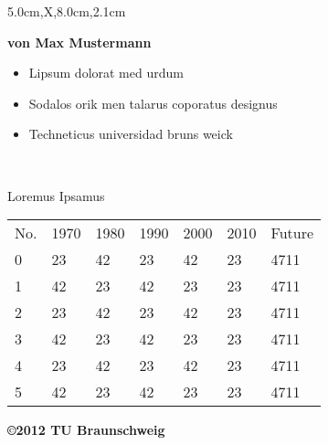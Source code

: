 \documentclass[a2paper,style=scifi,table,parskip=full]{tubsposter}
\begin{document}
  \begin{tubsposter}[bgcolor=tubsGreenLight]{5.0cm,X,8.0cm,2.1cm}
  \begin{posterrow}[bgcolor=tubsViolet,fgcolor=tubsWhite]
    \vfill
    \textbf{\large von Max Mustermann}
  \end{posterrow}
  \begin{posterrow}[X,X]
    \begin{postercol}
      \mdseries{}
      \lipsum[1]\par\lipsum[2]
      \begin{itemize}
        \item Lipsum dolorat med urdum
        \item Sodalos orik men talarus coporatus designus
        \item Techneticus universidad bruns weick
      \end{itemize}
    \end{postercol}
    \begin{postercol}[X,X]
      \begin{postersubrow}[bgimage=infozentrum,imagefit=autoclip]
        ~
      \end{postersubrow}
      \begin{postersubrow}[c,bgcolor=tubsGray20,fgcolor=tubsRed]
        \centering\itshape
        \lipsum[4]\par
        \raggedleft\upshape
        Loremus Ipsamus
      \end{postersubrow}
    \end{postercol}
  \end{posterrow}
  \begin{posterrow*}
    \large
    \begin{tabularx}{\textwidth}{lXXXXXX}
      \rowcolor{tuGray20}
      No. & 1970 & 1980 & 1990 & 2000 & 2010 & Future \\
      0   & 23   & 42   & 23   & 42   & 23   & 4711 \\
      1   & 42   & 23   & 42   & 23   & 23   & 4711 \\
      2   & 23   & 42   & 23   & 42   & 23   & 4711 \\
      3   & 42   & 23   & 42   & 23   & 23   & 4711 \\
      4   & 23   & 42   & 23   & 42   & 23   & 4711 \\
      5   & 42   & 23   & 42   & 23   & 23   & 4711 \\
    \end{tabularx}
  \end{posterrow*}
  \begin{modrow}[bgcolor=tubsViolet,fgcolor=tubsWhite]
    \bfseries\raggedleft\copyright 2012 TU Braunschweig
  \end{modrow}
  \end{tubsposter}
\end{document}
